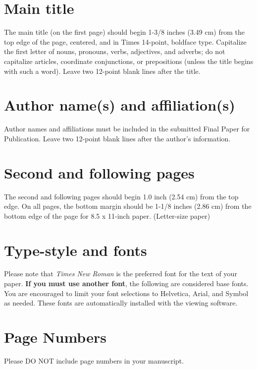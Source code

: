 \documentclass[10pt]{article}
\begin{document}
\section{Main title}

The main title (on the first page) should begin 1-3/8 inches (3.49 cm) from the top edge of the page, centered, and in Times 14-point, boldface type. Capitalize the first letter of nouns, pronouns, verbs, adjectives, and adverbs; do not capitalize articles, coordinate conjunctions, or prepositions (unless the title begins with such a word). Leave two 12-point blank lines after the title.

\section{Author name(s) and affiliation(s) }

Author names and affiliations must be included in the submitted Final Paper for Publication. Leave two 12-point blank lines after the author’s information. 

\section{Second and following pages}
\label{sect:pdf}

The second and following pages should begin 1.0 inch (2.54 cm) from the top edge. On all pages, the bottom margin should be 1-1/8 inches (2.86 cm) from the bottom edge of the page for 8.5 x 11-inch paper. (Letter-size paper)

\section{Type-style and fonts}
\label{sec:type-style}

Please note that {\em Times New Roman} is the preferred font for the text of your paper. \textbf{If you must use another font}, the following are considered base fonts.  You are encouraged to limit your font selections to Helvetica, Arial, and Symbol as needed. These fonts are automatically installed with the viewing software. 

\section{Page Numbers}

Please DO NOT include page numbers in your manuscript.

 
\end{document}
